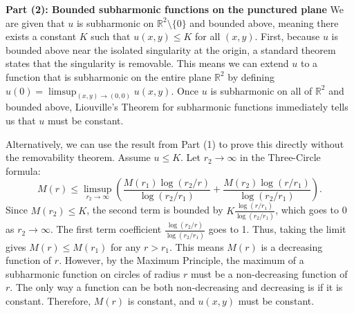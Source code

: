 \begin{solution}
\textbf{Part (2): Bounded subharmonic functions on the punctured plane}
We are given that $u$ is subharmonic on $\mathbb{R}^2 \setminus \{0\}$ and bounded above, meaning there exists a constant $K$ such that $u(x,y) \leq K$ for all $(x,y)$.
First, because $u$ is bounded above near the isolated singularity at the origin, a standard theorem states that the singularity is removable. This means we can extend $u$ to a function that is subharmonic on the entire plane $\mathbb{R}^2$ by defining $u(0) = \limsup_{(x,y) \to (0,0)} u(x,y)$.
Once $u$ is subharmonic on all of $\mathbb{R}^2$ and bounded above, Liouville's Theorem for subharmonic functions immediately tells us that $u$ must be constant.

Alternatively, we can use the result from Part (1) to prove this directly without the removability theorem.
Assume $u \leq K$. Let $r_2 \to \infty$ in the Three-Circle formula:
\[
M(r) \leq \limsup_{r_2 \to \infty} \left( \frac{M(r_1) \log(r_2/r)}{\log(r_2/r_1)} + \frac{M(r_2) \log(r/r_1)}{\log(r_2/r_1)} \right).
\]
Since $M(r_2) \leq K$, the second term is bounded by $K \frac{\log(r/r_1)}{\log(r_2/r_1)}$, which goes to 0 as $r_2 \to \infty$.
The first term coefficient $\frac{\log(r_2/r)}{\log(r_2/r_1)}$ goes to 1.
Thus, taking the limit gives $M(r) \leq M(r_1)$ for any $r > r_1$.
This means $M(r)$ is a decreasing function of $r$. However, by the Maximum Principle, the maximum of a subharmonic function on circles of radius $r$ must be a non-decreasing function of $r$.
The only way a function can be both non-decreasing and decreasing is if it is constant. Therefore, $M(r)$ is constant, and $u(x,y)$ must be constant.
\end{solution}

